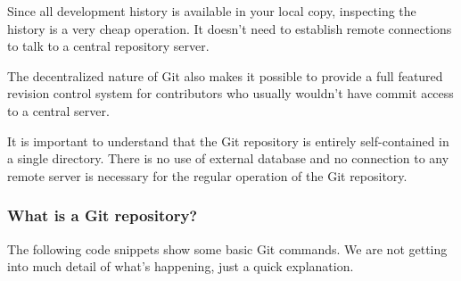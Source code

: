 Since all development history is available in your local copy,
inspecting the history is a very cheap operation.  It doesn't
need to establish remote connections to talk to a central repository
server.

The decentralized nature of Git also makes it possible to provide a
full featured revision control system for contributors who usually
wouldn't have commit access to a central server.

It is important to understand that the Git repository is entirely
self-contained in a single directory. There is no use of external
database and no connection to any remote server is necessary
for the regular operation of the Git repository.

\begin{frame}[fragile]
  \frametitle{What is a Git repository?}





\end{frame}

The following code snippets show some basic Git commands. We are not
getting into much detail of what's happening, just a quick
explanation.

